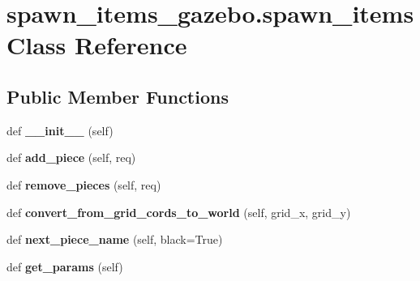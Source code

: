\hypertarget{classspawn__items__gazebo_1_1spawn__items}{}\section{spawn\+\_\+items\+\_\+gazebo.\+spawn\+\_\+items Class Reference}
\label{classspawn__items__gazebo_1_1spawn__items}
\subsection*{Public Member Functions}
\begin{DoxyCompactItemize}
\item 
\mbox{\label{classspawn__items__gazebo_1_1spawn__items_a370c03923259e3a5ed8617b82f8e3b85}} 
def {\bfseries \+\_\+\+\_\+init\+\_\+\+\_\+} (self)
\item 
\mbox{\label{classspawn__items__gazebo_1_1spawn__items_a3cb3614a547fba130c9375f460b02cf0}} 
def {\bfseries add\+\_\+piece} (self, req)
\item 
\mbox{\label{classspawn__items__gazebo_1_1spawn__items_aa155e7e0d9eb24bdb44eca7118de2bda}} 
def {\bfseries remove\+\_\+pieces} (self, req)
\item 
\mbox{\label{classspawn__items__gazebo_1_1spawn__items_adcffede5c513f0818ec47493842e2501}} 
def {\bfseries convert\+\_\+from\+\_\+grid\+\_\+cords\+\_\+to\+\_\+world} (self, grid\+\_\+x, grid\+\_\+y)
\item 
\mbox{\label{classspawn__items__gazebo_1_1spawn__items_a351480ddbe622e678719a4c3fddd7230}} 
def {\bfseries next\+\_\+piece\+\_\+name} (self, black=True)
\item 
\mbox{\label{classspawn__items__gazebo_1_1spawn__items_abded02329ea2bcb954a63552a9ebc113}} 
def {\bfseries get\+\_\+params} (self)
\end{DoxyCompactItemize}
